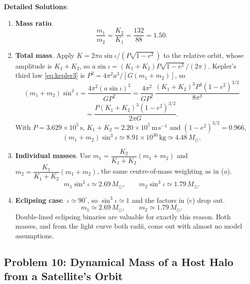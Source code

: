 \textbf{Detailed Solutions}:
\begin{enumerate}[label=(\alph*)]
	\item \textbf{Mass ratio}.
	\[
	\boxed{\frac{m_1}{m_2}=\frac{K_2}{K_1}=\frac{132}{88}=1.50.}
	\]
	
	\item \textbf{Total mass}. Apply $K=2\pi a\sin\iota/(P\sqrt{1-e^2})$ to the relative orbit, whose amplitude is $K_1+K_2$, so $a\sin\iota=(K_1+K_2)P\sqrt{1-e^2}/(2\pi)$. Kepler's third law \eqref{eq:kepler3} is $P^2=4\pi^2a^3/[G(m_1+m_2)]$, so
	\[
	(m_1+m_2)\sin^3\iota=\frac{4\pi^2(a\sin\iota)^3}{GP^2} = \frac{4\pi^2}{GP^2}\,\frac{(K_1+K_2)^3P^3(1-e^2)^{3/2}}{8\pi^3}
	\]
	\[
	=\frac{P(K_1+K_2)^3(1-e^2)^{3/2}}{2\pi G}.
	\]
	With $P=3.629\times10^5\,\mathrm s$, $K_1+K_2=2.20\times10^5\,\mathrm{m\,s^{-1}}$ and $(1-e^2)^{3/2}=0.966$,
	\[
	\boxed{(m_1+m_2)\sin^3\iota \simeq 8.91\times10^{30}\,\mathrm{kg}\simeq 4.48\,M_\odot.}
	\]
	
	\item \textbf{Individual masses}. Use $m_1=\dfrac{K_2}{K_1+K_2}(m_1+m_2)$ and $m_2=\dfrac{K_1}{K_1+K_2}(m_1+m_2)$, the same centre-of-mass weighting as in (a).
	\[
	\boxed{m_1\sin^3\iota \simeq 2.69\,M_\odot,\qquad m_2\sin^3\iota \simeq 1.79\,M_\odot.}
	\]
	
	\item \textbf{Eclipsing case}. $\iota\simeq90^\circ$, so $\sin^3\iota\simeq1$ and the factors in (c) drop out.
	\[
	\boxed{m_1\simeq2.69\,M_\odot, \qquad m_2\simeq1.79\,M_\odot.}
	\]
	Double-lined eclipsing binaries are valuable for exactly this reason. Both masses, and from the light curve both radii, come out with almost no model assumptions.
\end{enumerate}

\subsection{Problem 10: Dynamical Mass of a Host Halo from a Satellite's Orbit}
\label{prob:halo_mass}

